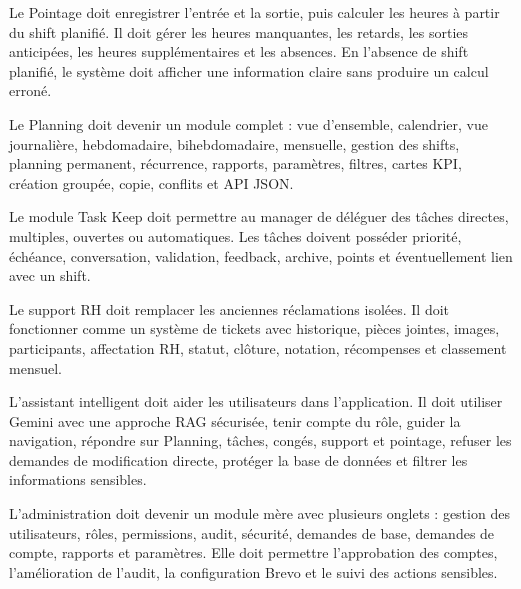 \documentclass[12pt,a4paper]{report}
\begin{document}
Le Pointage doit enregistrer l'entrée et la sortie, puis calculer les heures à partir du shift planifié. Il doit gérer les heures manquantes, les retards, les sorties anticipées, les heures supplémentaires et les absences. En l'absence de shift planifié, le système doit afficher une information claire sans produire un calcul erroné.

Le Planning doit devenir un module complet : vue d'ensemble, calendrier, vue journalière, hebdomadaire, bihebdomadaire, mensuelle, gestion des shifts, planning permanent, récurrence, rapports, paramètres, filtres, cartes KPI, création groupée, copie, conflits et API JSON.

Le module Task Keep doit permettre au manager de déléguer des tâches directes, multiples, ouvertes ou automatiques. Les tâches doivent posséder priorité, échéance, conversation, validation, feedback, archive, points et éventuellement lien avec un shift.

Le support RH doit remplacer les anciennes réclamations isolées. Il doit fonctionner comme un système de tickets avec historique, pièces jointes, images, participants, affectation RH, statut, clôture, notation, récompenses et classement mensuel.

L'assistant intelligent doit aider les utilisateurs dans l'application. Il doit utiliser Gemini avec une approche RAG sécurisée, tenir compte du rôle, guider la navigation, répondre sur Planning, tâches, congés, support et pointage, refuser les demandes de modification directe, protéger la base de données et filtrer les informations sensibles.

L'administration doit devenir un module mère avec plusieurs onglets : gestion des utilisateurs, rôles, permissions, audit, sécurité, demandes de base, demandes de compte, rapports et paramètres. Elle doit permettre l'approbation des comptes, l'amélioration de l'audit, la configuration Brevo et le suivi des actions sensibles.
\end{document}
